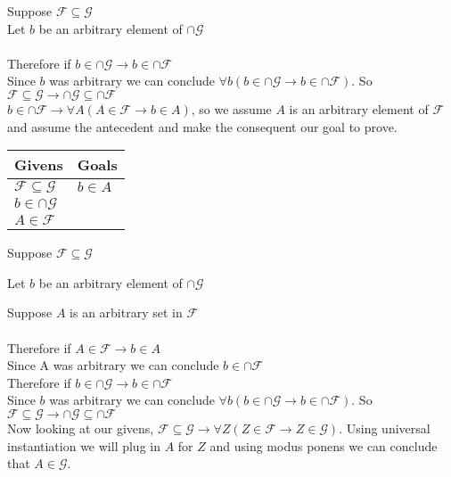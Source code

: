 \documentclass{article}
\newcommand{\n}{ \noindent }
\newcommand{\F}{\mathcal{F}}
\newcommand{\G}{\mathcal{G}}
\begin{document}
\n Suppose $\F \subseteq \G$ \\
\indent Let $b$ be an arbitrary element of $\cap \G$  \\
\indent \indent [proof of $b \in \cap \F$ ] \\
\indent Therefore if $b \in \cap \G \rightarrow b \in \cap \F$ \\
\n Since $b$ was arbitrary we can conclude $\forall b (b \in \cap \G \rightarrow b \in \cap \F)$. So $\F \subseteq \G \rightarrow \cap \G \subseteq \cap \F$ \\


\n $b \in \cap \F \rightarrow \forall A (A \in \F \rightarrow b \in A)$, so we assume $A$ is an arbitrary element of $\F$ and assume the antecedent and make the consequent our goal to prove. \\

\begin{table}[h]
\begin{tabular}{ll}
\hline
Givens & Goals   \\ \hline
$\F \subseteq \G$ & $b \in A$   \\
$b \in \cap \G$ & \\
$A \in \F$ & \\ \hline
\end{tabular}
\end{table}

\n Suppose $\F \subseteq \G$

\begin{addmargin}[0.55cm]{0cm}
\indent Let $b$ be an arbitrary element of $\cap \G$
\end{addmargin}

\indent \indent Suppose $A$ is an arbitrary set in $\F$ \\
\indent \indent \indent [proof of $b \in A$ ] \\
\indent \indent Therefore if $A \in \F \rightarrow b \in A $ \\
\indent \indent Since A was arbitrary we can conclude $b \in \cap \F$ \\
\indent Therefore if $b \in \cap \G \rightarrow b \in \cap \F$ \\
\n Since $b$ was arbitrary we can conclude $\forall b (b \in \cap \G \rightarrow b \in \cap \F)$. So $\F \subseteq \G \rightarrow \cap \G \subseteq \cap \F$ \\


\n Now looking at our givens, $\F \subseteq \G \rightarrow \forall Z ( Z \in \F \rightarrow Z \in \G)$. Using universal instantiation we will plug in $A$ for $Z$ and using modus ponens we can conclude that $A \in \G$. \\
\end{document}
